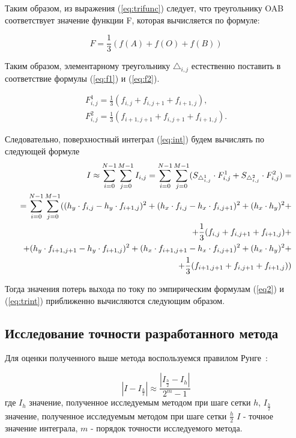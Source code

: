 \documentclass{article}
\begin{document}
\begin{enumerate}
Таким образом, из выражения (\ref{eq:trifunc}) следует, что треугольнику OAB соответствует значение функции F, которая вычисляется по формуле:

\begin{equation}
F =  \frac{1}{3}(f(A)+f(O)+f(B))
\end{equation}

\end{enumerate}

Таким образом, элементарному треугольнику $\triangle_{i,j}$ естественно поставить в соответствие формулы (\ref{eq:f1}) и (\ref{eq:f2}).

\begin{align}
F^1_{i,j} = \frac{1}{3}(f_{i,j}+f_{i,j+1}+f_{i+1,j}), \label{eq:f1}\\
F^2_{i,j} = \frac{1}{3}(f_{i+1,j+1}+f_{i,j+1}+f_{i+1,j}). \label{eq:f2}
\end{align}

Следовательно, поверхностный интеграл (\ref{eq:int}) будем вычислять по следующей формуле
\begin{align}\label{eq:trint}
I \approx \sum_{i=0}^{N-1} \sum_{j=0}^{M-1} I_{i,j} = \sum_{i=0}^{N-1} \sum_{j=0}^{M-1} (S_{\triangle_{i,j}^1} \cdot F_{i,j}^1 + S_{\triangle_{i,j}^2} \cdot F_{i,j}^2) = \notag \\
= \sum_{i=0}^{N-1} \sum_{j=0}^{M-1} ((h_y \cdot f_{i,j} - h_y \cdot f_{i+1,j})^2 + (h_x \cdot f_{i,j} - h_x \cdot f_{i,j+1})^2 + (h_x \cdot h_y)^2 + \notag \\
+ \frac{1}{3}(f_{i,j}+f_{i,j+1}+f_{i+1,j}) + \notag \\
+(h_y \cdot f_{i+1,j+1} - h_y \cdot f_{i+1,j})^2 + (h_x \cdot f_{i+1,j+1} - h_x \cdot f_{i,j+1})^2 + (h_x \cdot h_y)^2 + \notag \\
+\frac{1}{3}(f_{i+1,j+1}+f_{i,j+1}+f_{i+1,j}))
\end{align}

Тогда значения потерь выхода по току по эмпирическим формулам (\ref{eq2}) и (\ref{eq:trint}) приближенно вычисляются следующим образом.



\subsection{Исследование точности разработанного метода}

Для оценки полученного выше метода воспользуемся правилом Рунге~\cite{litlink:samarskiy}:

\begin{equation}\label{eq:runge1}
|I-I_{\frac{h}{2}}| \approx \frac{|I_{\frac{h}{2}}-I_{h}|}{2^m-1}
\end{equation}
где $I_h$ значение, полученное исследуемым методом при шаге сетки $h$, $I_{\frac{h}{2}}$ значение, полученное исследуемым методом при шаге сетки $\frac{h}{2}$ $I$ - точное значение интеграла, $m$ - порядок точности исследуемого метода.
\end{document}
